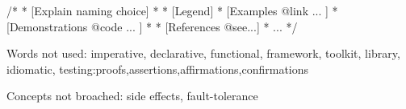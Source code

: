 \documentclass{article}
\begin{document}
/*
 * [Explain naming choice]
 *
 * [Legend]
 *		[Examples {@link} ... ]
 *			[Demonstrations {@code} ... ]
 *
 * [References @see...]
 * ...
 */

Words not used:
imperative, declarative, functional, framework, toolkit, library, 
idiomatic, testing:proofs,assertions,affirmations,confirmations

Concepts not broached:
side effects, fault-tolerance
\end{document}
